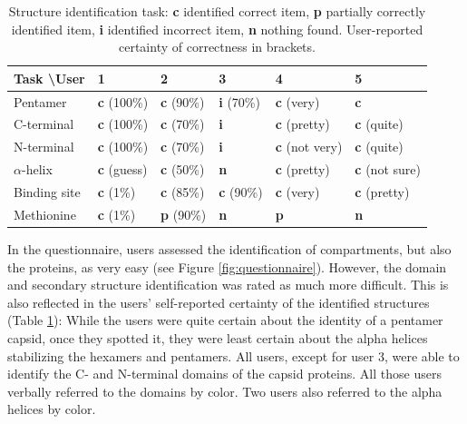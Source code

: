 \documentclass{egpubl}
\begin{document}
\begin{table}
	 	
	 	\centering
	 	{\scriptsize \begin{tabular}{| l | l | l | l | l | l |}
	 		\hline
	 		Task \textbackslash User & 1 & 2 & 3 & 4 & 5 \\
	 		\hline
	 		Pentamer       & \textbf{\color{cc}c} (100\%) 	& \textbf{\color{cc}c} (90\%) 	& \textbf{\color{ci}i} (70\%) 	& \textbf{\color{cc}c} (very) 		& \textbf{\color{cc}c}\\
	 		\hline
	 		C-terminal     & \textbf{\color{cc}c} (100\%) 	& \textbf{\color{cc}c} (70\%) 	& \textbf{\color{ci}i} 		& \textbf{\color{cc}c} (pretty) 	& \textbf{\color{cc}c} (quite) \\
	 		\hline
	 		N-terminal     & \textbf{\color{cc}c} (100\%) 	& \textbf{\color{cc}c} (70\%) 	& \textbf{\color{ci}i} 		& \textbf{\color{cc}c} (not very) 	& \textbf{\color{cc}c} (quite)\\
	 		\hline
	 		$\alpha$-helix & \textbf{\color{cc}c} (guess) 	& \textbf{\color{cc}c} (50\%) 	& \textbf{\color{cn}n} 		& \textbf{\color{cc}c} (pretty) 	& \textbf{\color{cc}c} (not sure) \\
	 		\hline
	 		Binding site   & \textbf{\color{cc}c} (1\%) 	& \textbf{\color{cc}c} (85\%) 	& \textbf{\color{cc}c} (90\%) 	& \textbf{\color{cc}c} (very) 		& \textbf{\color{cc}c} (pretty) \\
	 		\hline
	 		Methionine      & \textbf{\color{cc}c} (1\%) 	& \textbf{\color{cp}p} (90\%) 	& \textbf{\color{cn}n} 		& \textbf{\color{cp}p} 			& \textbf{\color{cn}n}  \\
	 		\hline
	 	\end{tabular}}
	 	\caption{Structure identification task: \textbf{\color{cc}c} identified correct item, \textbf{\color{cp}p} partially correctly identified item, \textbf{\color{ci}i} identified incorrect item, \textbf{\color{cn}n} nothing found. User-reported certainty of correctness in brackets. }
	 	\label{table:identification}
	 \end{table}
	 
	 In the questionnaire, users assessed the identification of compartments, but also the proteins, as very easy  (see Figure \ref{fig:questionnaire}). 
	 However, the domain and secondary structure identification was rated as much more difficult. 
	 This is also reflected in the users' self-reported certainty of the identified structures (Table \ref{table:identification}): 
	 While the users were quite certain about the identity of a pentamer capsid, once they spotted it, they were least certain about the alpha helices stabilizing the hexamers and pentamers. 
	 All users, except for user 3, were able to identify the C- and N-terminal domains of the capsid proteins. 
	 All those users verbally referred to the domains by color. 
	 Two users also referred to the alpha helices by color. 
	 
\end{document}

